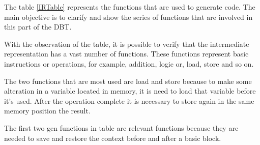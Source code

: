 \documentclass[11pt]{report}
\begin{document}
	The table \ref{IRTable} represents the functions that are used to generate code. The main objective is  to clarify and show the series of functions that are involved in this part of the DBT. 
	
	With the observation of the table, it is possible to verify that the intermediate representation has a vast number of functions. These functions represent basic instructions or operations, for example, addition, logic or, load, store and so on.
	
	The two functions that are most used are load and store because to make some alteration in a variable located in memory, it is need to load that variable before it's used. After the operation complete it is necessary to store again in the same memory position the result.
	
	The first two gen functions in table are relevant functions because they are needed to save and restore the context before and after a basic block.
	
\end{document}
